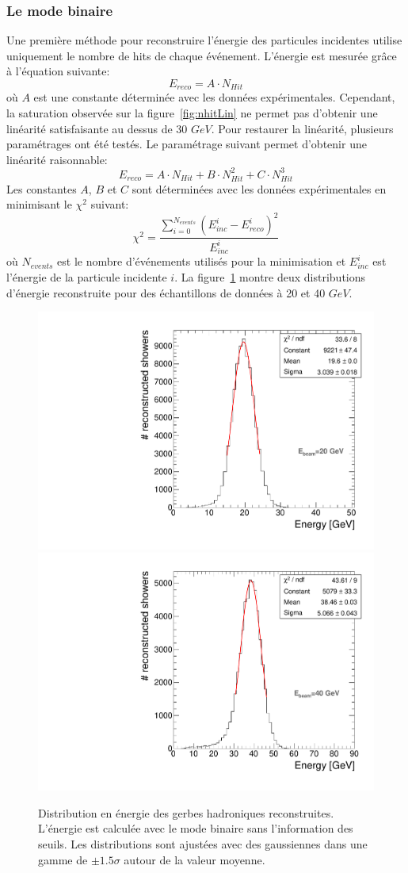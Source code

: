 \subsubsection{Le mode binaire}
Une première méthode pour reconstruire l'énergie des particules incidentes utilise uniquement le nombre de hits de chaque événement. L'énergie est mesurée grâce à l'équation suivante:
\begin{equation}
  E_{reco} = A \cdot N_{Hit}
\end{equation}
où $A$ est une constante déterminée avec les données expérimentales. Cependant, la saturation observée sur la figure~\ref{fig:nhitLin} ne permet pas d'obtenir une linéarité satisfaisante au dessus de 30 $GeV$. Pour restaurer la linéarité, plusieurs paramétrages ont été testés. Le paramétrage suivant permet d'obtenir une linéarité raisonnable:
\begin{equation}
  \label{eq.ereco_bin}
  E_{reco} = A \cdot N_{Hit} + B \cdot N_{Hit}^2 + C \cdot N_{Hit}^3
\end{equation}
Les constantes $A$, $B$ et $C$ sont déterminées avec les données expérimentales en minimisant le $\chi^2$ suivant:
\begin{equation}
  \chi^2 = \frac{\sum_{i=0}^{N_{events}}(E_{inc}^i-E_{reco}^i)^2}{E_{inc}^i}
\end{equation}
où $N_{events}$ est le nombre d'événements utilisés pour la minimisation et $E_{inc}^i$ est l'énergie de la particule incidente $i$. La figure~\ref{fig:energy_dist_bin} montre deux distributions d'énergie reconstruite pour des échantillons de données à 20 et 40 $GeV$. 
\begin{figure}[!ht]
  \begin{center}
    \includegraphics[width=.45\textwidth]{SDHCAL/figs/gfit-en-20-bin.pdf}
    \includegraphics[width=.45\textwidth]{SDHCAL/figs/gfit-en-40-bin.pdf}
    \caption{Distribution en énergie des gerbes hadroniques reconstruites. L'énergie est calculée avec le mode binaire sans l'information des seuils. Les distributions sont ajustées avec des gaussiennes dans une gamme de $\pm1.5\sigma$ autour de la valeur moyenne.}
    \label{fig:energy_dist_bin}
  \end{center}
\end{figure}
